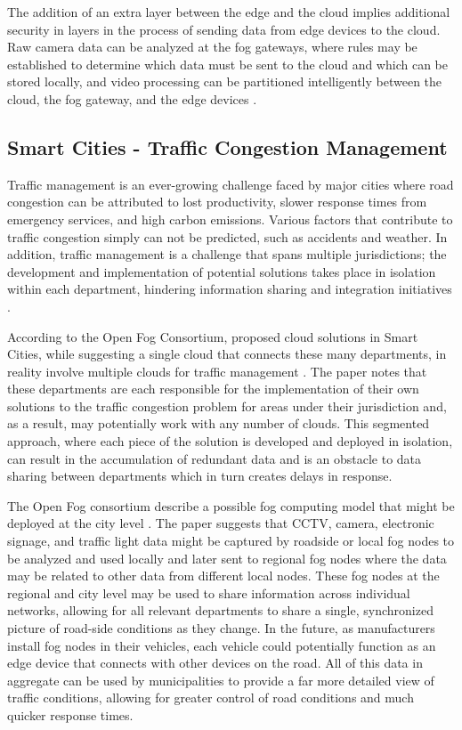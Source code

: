 \documentclass{article}
\begin{document}
The addition of an extra layer between the edge and the cloud implies additional security in layers in the process of sending data from edge devices to the cloud. Raw camera data can be analyzed at the fog gateways, where rules may be established to determine which data must be sent to the cloud and which can be stored locally, and video processing can be partitioned intelligently between the cloud, the fog gateway, and the edge devices \cite{openfogconsortium2017visualsecurity}.

\subsection{Smart Cities - Traffic Congestion Management}
Traffic management is an ever-growing challenge faced by major cities where road congestion can be attributed to lost productivity, slower response times from emergency services, and high carbon emissions. Various factors that contribute to traffic congestion simply can not be predicted, such as accidents and weather. In addition, traffic management is a challenge that spans multiple jurisdictions; the development and implementation of potential solutions takes place in isolation within each department, hindering information sharing and integration initiatives \cite{openfogconsortium2017trafficmanagement}.

According to the Open Fog Consortium, proposed cloud solutions in Smart Cities, while suggesting a single cloud that connects these many departments, in reality involve multiple clouds for traffic management \cite{openfogconsortium2017trafficmanagement}. The paper notes that these departments are each responsible for the implementation of their own solutions to the traffic congestion problem for areas under their jurisdiction and, as a result, may potentially work with any number of clouds. This segmented approach, where each piece of the solution is developed and deployed in isolation, can result in the accumulation of redundant data and is an obstacle to data sharing between departments which in turn creates delays in response.

The Open Fog consortium describe a possible fog computing model that might be deployed at the city level \cite{openfogconsortium2017trafficmanagement}. The paper suggests that CCTV, camera, electronic signage, and traffic light data might be  captured by roadside or local fog nodes to be analyzed and used locally and later sent to regional fog nodes where the data may be related to other data from different local nodes. These fog nodes at the regional and city level may be used to share information across individual networks, allowing for all relevant departments to share a single, synchronized picture of road-side conditions as they change. In the future, as manufacturers install fog nodes in their vehicles, each vehicle could potentially function as an edge device that connects with other devices on the road. All of this data in aggregate can be used by municipalities to provide a far more detailed view of traffic conditions, allowing for greater control of road conditions and much quicker response times.

\pagebreak

\renewcommand{\refname}{\section{References}}


\end{document}
